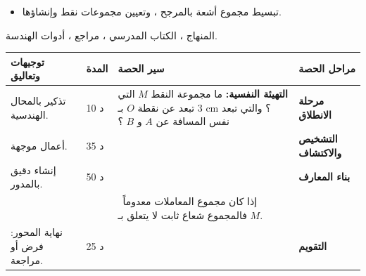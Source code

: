 \documentclass[12pt,a4paper]{article}
\newenvironment{LTR}{\begin{otherlanguage}{english}}{\end{otherlanguage}}
\newcommand{\ar}[1]{\foreignlanguage{arabic}{#1}}
\newcommand{\Phase}[1]{\textbf{#1}}
\newenvironment{Sayr}{%
\begin{LTR}\renewcommand{\arraystretch}{1.25}
\begin{longtable}{|p{0.17\textwidth}|>{\centering\arraybackslash}p{0.06\textwidth}|p{0.53\textwidth}|>{\centering\arraybackslash}p{0.12\textwidth}|}
\hline\rowcolor{cThm!12}\ar{\textbf{توجيهات وتعاليق}} & \ar{\textbf{المدة}} & \ar{\textbf{سير الحصة}} & \ar{\textbf{مراحل الحصة}}\\\hline\endhead
\hline\endfoot}{\end{longtable}\end{LTR}}
\newcommand{\Row}[4]{\ar{\small #4} & \ar{#3} & \ar{#2} & \cellcolor{cThm!8}\ar{\Phase{#1}}\\\hline}
\newcommand{\Lab}[2]{\foreignlanguage{english}{\tcbox[on line,colback=#1,colframe=#1,boxrule=0pt,arc=2pt,boxsep=1pt,left=5pt,right=5pt,top=1pt,bottom=1pt]{\ar{\textcolor{white}{\textbf{#2}}}}}}
\newcommand{\ck}{\ensuremath{{\color{cRem}\checkmark}}}
\begin{document}
{\begin{itemize}\item تبسيط مجموع أشعة بالمرجح ، وتعيين مجموعات نقط وإنشاؤها.\end{itemize}}%
{المنهاج ، الكتاب المدرسي ، مراجع ، أدوات الهندسة.}
\begin{Sayr}
\Row{مرحلة الانطلاق}{%
\textbf{التهيئة النفسية:} ما مجموعة النقط $M$ التي تبعد عن نقطة $O$ بـ $3$ cm ؟ والتي تبعد نفس المسافة عن $A$ و $B$ ؟}{10 د}{تذكير بالمحال الهندسية.}
\Row{التشخيص والاكتشاف}{%
\Lab{cEx}{مناقشة أعمال موجهة (باب المرجح)}\par\ck\ نبسط $\overrightarrow{MA}+\overrightarrow{MB}$ باستعمال المنتصف ، ثم نترجم المساواة إلى مسافة.\par
}{35 د}{أعمال موجهة.}
\Row{بناء المعارف}{%
\Lab{cMeth}{طريقة}\ نعوّض $\alpha\overrightarrow{MA}+\beta\overrightarrow{MB}$ بـ $(\alpha+\beta)\overrightarrow{MG}$ ، ثم نعرف المجموعة:\par\ck\ $MG=r$ ($r>0$): دائرة مركزها $G$ ونصف قطرها $r$.\par
\ck\ $MG=MH$: محور القطعة $[GH]$.\par
\Lab{cEx}{مثال}\par\ck\ $\|\overrightarrow{MA}+\overrightarrow{MB}\|=AB$ ، $I$ منتصف $[AB]$: $2MI=AB$ ، أي $MI=\frac{AB}2$: الدائرة ذات القطر $[AB]$.\par
\ck\ $\|\overrightarrow{MA}+\overrightarrow{MB}\|=\|\overrightarrow{MA}+\overrightarrow{MC}\|$ ، $I$ و $J$ منتصفا $[AB]$ و $[AC]$: $MI=MJ$: محور $[IJ]$.\par
}{50 د}{إنشاء دقيق بالمدور.}
\Row{}{%
\Lab{cThm!80!black}{حذار}\ إذا كان مجموع المعاملات معدوماً فالمجموع شعاع ثابت لا يتعلق بـ $M$.}{}{}
\Row{التقويم}{%
\Lab{cEx}{تطبيق}\par عيّن مجموعة النقط $M$ حيث $\|3\overrightarrow{MA}-\overrightarrow{MB}\|=4$.\par\textbf{الحل:} $G$ مرجح $\{(A;3),(B;-1)\}$: $3\overrightarrow{MA}-\overrightarrow{MB}=2\overrightarrow{MG}$ ، إذن $MG=2$: دائرة مركزها $G$ ونصف قطرها $2$ ، مع $\overrightarrow{AG}=-\frac12\overrightarrow{AB}$.\par\textbf{واجب منزلي:} تمارين 64 إلى 87 من باب المرجح.\par\smallskip\textbf{ملاحظات حول سير الحصة:} \dotfill}{25 د}{نهاية المحور: فرض أو مراجعة.}
\end{Sayr}
\end{document}
